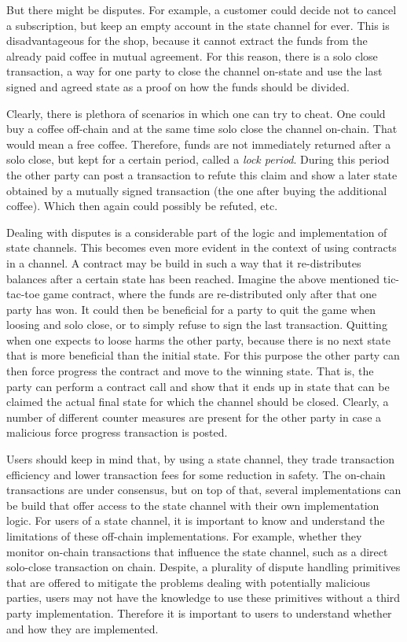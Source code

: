 But there might be disputes. For example, a customer
could decide not to cancel a subscription, but keep an empty account
in the state channel for ever. This is disadvantageous for the shop,
because it cannot extract the funds from the already paid coffee in
mutual agreement. For this reason, there is a solo close transaction,
a way for one party to close the channel on-state and use the last
signed and agreed state as a proof on how the funds should be divided.

Clearly, there is plethora of scenarios in which one can try to
cheat. One could buy a coffee off-chain and at the same time solo
close the channel on-chain. That would mean a free coffee. Therefore,
funds are not immediately returned after a solo close, but kept for a
certain period, called a \textit{lock period}. During this period the
other party can post a transaction to refute this claim and show a
later state obtained by a mutually signed transaction (the one after
buying the additional coffee). Which then again could possibly be
refuted, etc.

Dealing with disputes is a considerable part of the logic and
implementation of state channels. This becomes even more evident in
the context of using contracts in a channel. A contract may be build
in such a way that it re-distributes balances after a certain state has
been reached. Imagine the above mentioned tic-tac-toe game contract,
where the funds are re-distributed only after that one party has
won. It could then be beneficial for a party to quit the
game when loosing and solo close, or to simply refuse to sign the last
transaction. Quitting when one expects to loose
harms the other party, because there is no next state that is more
beneficial than the initial state. For this purpose the other party
can then force progress the contract and move to the winning
state. That is, the party can perform a contract call and show that it
ends up in state that can be claimed the actual final state for which
the channel should be closed. Clearly, a number of different counter
measures are present for the other party in case a malicious force
progress transaction is posted.

Users should keep in mind that, by using a state channel, they trade
transaction efficiency and lower transaction fees for some reduction in
safety.
The on-chain transactions are under consensus, but on top of that,
several implementations can be build that offer access to the state
channel with their own implementation logic. For users of a state
channel, it is important to know and understand the limitations of
these off-chain implementations. For example, whether they monitor
on-chain transactions that influence the state channel, such as a
direct solo-close transaction on chain.
Despite, a plurality of dispute handling primitives that are offered to
mitigate the problems dealing with potentially malicious parties,
users may not have the knowledge to use these primitives without a
third party implementation. Therefore it is important to users to understand
whether and how they are implemented.
